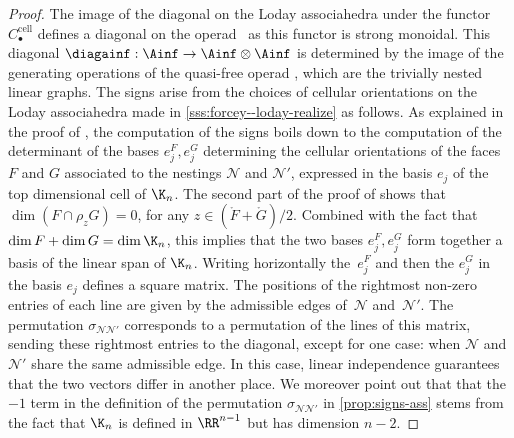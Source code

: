 \documentclass[JEP,XML,SOM,NoFloatCountersInSection,Unicode,published]{cedram}
\theoremstyle{definition}
\theoremstyle{plain}
\begin{document}
\begin{proof}
The image of the diagonal on the Loday associahedra under the functor $C_\bullet^{\mathrm{cell}}$ defines a diagonal on the operad \Ainf\ as this functor is strong monoidal.
This diagonal $\diagainf : \Ainf \to \Ainf \otimes \Ainf$ is determined by the image of the generating operations of the quasi-free operad \Ainf, which are the trivially nested linear graphs.
The signs arise from the choices of cellular orientations on the Loday associahedra made in \cref{sss:forcey--loday-realize} as follows.
As explained in the proof of \cite[Prop.\,4.27]{LA21}, the computation of the signs boils down to the computation of the determinant of the bases $e_j^{F}, e_j^{G}$ determining the cellular orientations of the faces $F$ and $G$ associated to the nestings $\mathcal{N}$ and $\mathcal{N}'$, expressed in the basis $e_j$ of the top dimensional cell of $\K_n$.
The second part of the proof of \cite[Th.\,1.26]{LA21} shows that $\dim(F\cap \rho_z G)=0$, for any $z \in (\mathring F+ \mathring G)/2$.
Combined with the fact that $\dim F + \dim G = \dim \K_n$, this implies that the two bases $e_j^F, e_j^G$ form together a basis of the linear span of $\K_n$.
Writing horizontally the~$e_j^F$ and then the $e_j^G$ in the basis $e_j$ defines a square matrix.
The positions of the rightmost non-zero entries of each line are given by the admissible edges of~$\mathcal{N}$ and~$\mathcal{N}'$.
The permutation $\sigma_{\mathcal{N}\mathcal{N}'}$ corresponds to a permutation of the lines of this matrix, sending these rightmost entries to the diagonal, except for one case: when $\mathcal{N}$ and $\mathcal{N}'$ share the same admissible edge.
In this case, linear independence guarantees that the two vectors differ in another place.
We moreover point out that that the $-1$ term in the definition of the permutation $\sigma_{\mathcal{N}\mathcal{N}'}$ in \cref{prop:signs-ass} stems from the fact that $\K_n$ is defined in $\RR^{n-1}$ but has dimension $n-2$.
\end{proof}
\end{document}
